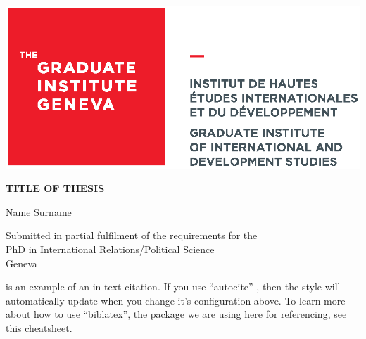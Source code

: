 \documentclass[12pt,a4paper]{article}
\begin{document}
\hspace*{-1.25cm}
\includegraphics[width=0.4\linewidth]{Logo_CMYK_Hi.eps}

{\centering \sffamily
\vspace{3cm}
{\Large\textbf{TITLE OF THESIS}}

\vspace{3cm}
Name Surname

\vspace{8cm}
Submitted in partial fulfilment of the requirements for the\\
	PhD in International Relations/Political Science\\

\vspace{1cm}Geneva

\vspace{1cm}\the\year

}

\newpage
{}
\justifying
\rmfamily

\textcite{Hollway:2017ke} is an example of an in-text citation. If you use ``autocite'' \autocite{Hollway:2017ke}, then the style will automatically update when you change it's configuration above. To learn more about how to use ``biblatex'', the package we are using here for referencing, see \href{http://tug.ctan.org/info/biblatex-cheatsheet/biblatex-cheatsheet.pdf}{this cheatsheet}.
	
\newpage
\printbibliography
\end{document}
